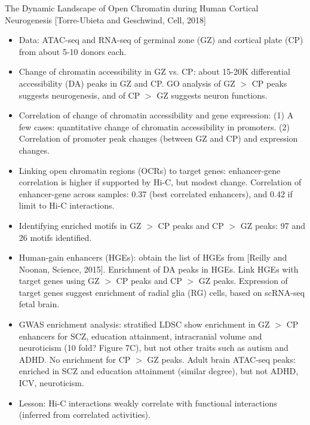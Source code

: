 \documentclass{report}
\begin{document}
The Dynamic Landscape of Open Chromatin during Human Cortical Neurogenesis [Torre-Ubieta and Geschwind, Cell, 2018]
\begin{itemize}
	
	\item Data: ATAC-seq and RNA-seq of germinal zone (GZ) and cortical plate (CP) from about 5-10 donors each. 
	
	\item Change of chromatin accessibility in GZ vs. CP: about 15-20K differential accessibility (DA) peaks in GZ and CP. GO analysis of GZ $>$ CP peaks suggests neurogenesis, and of CP $>$ GZ suggests neuron functions. 
	
	\item Correlation of change of chromatin accessibility and gene expression: (1) A few cases: quantitative change of chromatin accessibility in promoters. (2) Correlation of promoter peak changes (between GZ and CP) and expression changes. 
	
	\item Linking open chromatin regions (OCRs) to target genes: enhancer-gene correlation is higher if supported by Hi-C, but modest change. Correlation of enhancer-gene across samples: 0.37 (best correlated enhancers), and 0.42 if limit to Hi-C interactions. 
	
	\item Identifying enriched motifs in GZ $>$ CP peaks and CP $>$ GZ peaks: 97 and 26 motifs identified. 
	
	\item Human-gain enhancers (HGEs): obtain the list of HGEs from [Reilly and Noonan, Science, 2015]. Enrichment of DA peaks in HGEs. Link HGEs with target genes using GZ $>$ CP peaks and CP $>$ GZ peaks. Expression of target genes suggest enrichment of radial glia (RG) cells, based on scRNA-seq fetal brain. 
	
	\item GWAS enrichment analysis: stratified LDSC show enrichment in GZ $>$ CP enhancers for SCZ, education attainment, intracranial volume and neuroticism (10 fold? Figure 7C), but not other traits such as autism and ADHD. No enrichment for CP $>$ GZ peaks. Adult brain ATAC-seq peaks: enriched in SCZ and education attainment (similar degree), but not ADHD, ICV, neuroticism. 
	
	\item Lesson: Hi-C interactions weakly correlate with functional interactions (inferred from correlated activities). 
\end{itemize}
\end{document}
